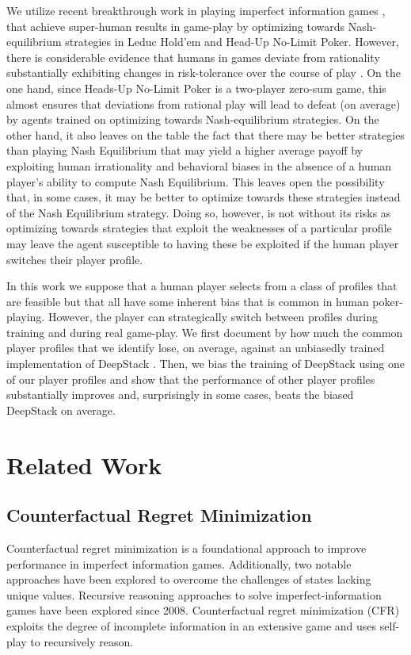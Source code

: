 \documentclass{article}
\begin{document}
We utilize recent breakthrough work in playing imperfect information games \cite{moravvcik2017deepstack}, \cite{brown2018depth} that achieve super-human results in game-play by optimizing towards Nash-equilibrium strategies in Leduc Hold'em and Head-Up No-Limit Poker. However, there is considerable evidence that humans in games deviate from rationality substantially \cite{goeree2001ten} exhibiting changes in risk-tolerance over the course of play \cite{eil2014staying}. On the one hand, since Heads-Up No-Limit Poker is a two-player zero-sum game, this almost ensures that deviations from rational play will lead to defeat (on average) by agents trained on optimizing towards Nash-equilibrium strategies. On the other hand, it also leaves on the table the fact that there may be better strategies than playing Nash Equilibrium that may yield a higher average payoff by exploiting human irrationality and behavioral biases in the absence of a human player's ability to compute Nash Equilibrium. This leaves open the possibility that, in some cases, it may be better to optimize towards these strategies instead of the Nash Equilibrium strategy. Doing so, however, is not without its risks as optimizing towards strategies that exploit the weaknesses of a particular profile may leave the agent susceptible to having these be exploited if the human player switches their player profile.

\indent In this work we suppose that a human player selects from a class of profiles that are feasible but that all have some inherent bias that is common in human poker-playing. However, the player can strategically switch between profiles during training and during real game-play. We first document by how much the common player profiles that we identify lose, on average, against an unbiasedly trained implementation of DeepStack \cite{moravvcik2017deepstack}. Then, we bias the training of DeepStack using one of our player profiles and show that the performance of other player profiles substantially improves and, surprisingly in some cases, beats the biased DeepStack on average.

\section{Related Work}\label{sec:related}

\subsection{Counterfactual Regret Minimization}
Counterfactual regret minimization is a foundational approach to improve performance in imperfect information games. Additionally, two notable approaches have been explored to overcome the challenges of states lacking unique values. Recursive reasoning approaches to solve imperfect-information games have been explored since 2008. Counterfactual regret minimization (CFR) exploits the degree of incomplete information in an extensive game and uses self-play to recursively reason.
\end{document}
